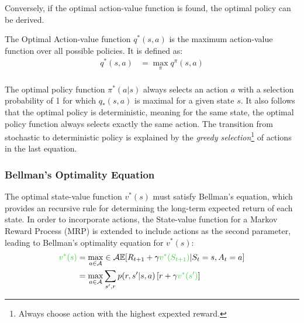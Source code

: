 \documentclass[../xlapes02]{subfiles}
\begin{document}
    Conversely, if the optimal action-value function is found, the optimal policy can be derived.
    \begin{definition}
        The Optimal Action-value function $q^*(s, a)$ is the maximum action-value function over all possible policies. It is defined as:
        \begin{equation}
            \begin{split}
                q^*(s, a) &= \max_{\pi} q^{\pi}(s, a) \\
            \end{split}
        \end{equation}
    \end{definition}

    The optimal policy function $\pi^*(a | s)$ always selects an action $a$ with a selection probability of 1 for which $q_*(s, a)$ is maximal for a given state $s$. It also follows that the optimal policy is deterministic, meaning for the same state, the optimal policy function always selects exactly the same action. The transition from stochastic to deterministic policy is explained by the \emph{greedy selection}\footnote{Always choose action with the highest expexted reward.} of actions in the last equation.

    \subsubsection{Bellman's Optimality Equation}\label{subsubsec:bellman-optimality-equation}
    The optimal state-value function $v^*(s)$ must satisfy Bellman's equation, which provides an recursive rule for determining the long-term expected return of each state. In order to incorporate actions, the State-value function for a Markov Reward Process (MRP) is extended to include actions as the second parameter, leading to Bellman's optimality equation for $v^*(s)$:
    \begin{equation}
        \begin{split}
            \textcolor[RGB]{51,204,51}{v^*(s)} &= \max_{a\in\mathcal{A}} \in \mathcal{A} \mathbb{E}[R_{t+1} + \gamma \textcolor[RGB]{51,204,51}{v^*(S_{t+1})} | S_t = s, A_t = a] \\
            &= \max_{a\in\mathcal{A}} \sum_{s', r} p(r, s'|s, a) \left[r + \gamma \textcolor[RGB]{51,204,51}{v^*(s')}  \right]
        \end{split}
    \end{equation}
\end{document}
